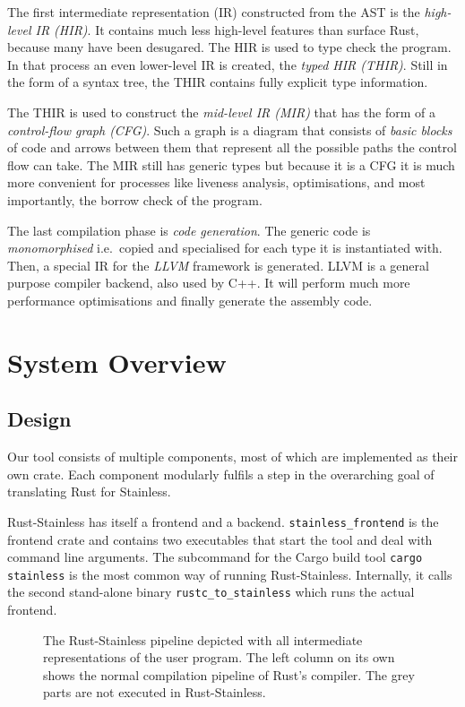 The first intermediate representation (IR) constructed from the AST is the
\emph{high-level IR (HIR)}. It contains much less high-level features than
surface Rust, because many have been desugared. The HIR is used to type check
the program. In that process an even lower-level IR is created, the \emph{typed
HIR (THIR)}. Still in the form of a syntax tree, the THIR contains fully
explicit type information.

The THIR is used to construct the \emph{mid-level IR (MIR)} that has the form of
a \emph{control-flow graph (CFG)}. Such a graph is a diagram that consists of
\emph{basic blocks} of code and arrows between them that represent all the
possible paths the control flow can take. The MIR still has generic types but
because it is a CFG it is much more convenient for processes like liveness
analysis, optimisations, and most importantly, the borrow check of the program.

The last compilation phase is \emph{code generation}. The generic code is
\emph{monomorphised} i.e.~copied and specialised for each type it is
instantiated with. Then, a special IR for the \emph{LLVM} framework \cite{llvm}
is generated. LLVM is a general purpose compiler backend, also used by C++. It
will perform much more performance optimisations and finally generate the
assembly code.

\section{System Overview}

\subsection{Design}

Our tool consists of multiple components, most of which are implemented as their
own crate. Each component modularly fulfils a step in the overarching goal of
translating Rust for Stainless.

Rust-Stainless has itself a frontend and a backend.
\lstinline!stainless_frontend! is the frontend crate and contains two
executables that start the tool and deal with command line arguments. The
subcommand for the Cargo build tool \passthrough{\lstinline!cargo stainless!} is
the most common way of running Rust-Stainless. Internally, it calls the second
stand-alone binary \lstinline!rustc_to_stainless! which runs the actual
frontend.

\begin{figure}
  \begin{center}
  
  \caption{
    The Rust-Stainless pipeline depicted with all intermediate representations
    of the user program. The left column on its own shows the normal compilation
    pipeline of Rust's compiler. The grey parts are not executed in Rust-Stainless.
  }
  \label{fig:flowchart}
  \end{center}
\end{figure}

